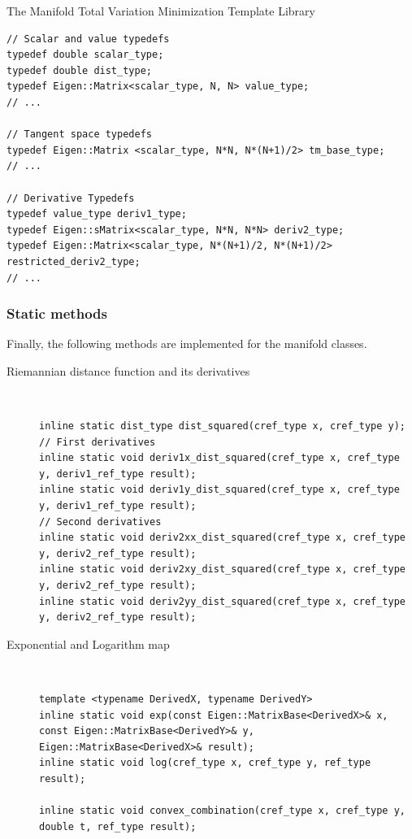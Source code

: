 \begin{chapter}{The Manifold Total Variation Minimization Template Library}
\cppinline
\begin{lstlisting}
// Scalar and value typedefs
typedef double scalar_type;
typedef double dist_type;
typedef Eigen::Matrix<scalar_type, N, N> value_type;
// ...

// Tangent space typedefs
typedef Eigen::Matrix <scalar_type, N*N, N*(N+1)/2> tm_base_type;
// ...

// Derivative Typedefs
typedef value_type deriv1_type;
typedef Eigen::sMatrix<scalar_type, N*N, N*N> deriv2_type;
typedef Eigen::Matrix<scalar_type, N*(N+1)/2, N*(N+1)/2> restricted_deriv2_type;
// ...
\end{lstlisting}

\subsubsection{Static methods} %
\label{ssub:Static methods}
Finally, the following methods are implemented for the manifold classes.

\begin{description}
    
    \item[Riemannian distance function and its derivatives] \hfill \\
	\cppinline
	\begin{lstlisting}
inline static dist_type dist_squared(cref_type x, cref_type y);
// First derivatives	    
inline static void deriv1x_dist_squared(cref_type x, cref_type y, deriv1_ref_type result);
inline static void deriv1y_dist_squared(cref_type x, cref_type y, deriv1_ref_type result);
// Second derivatives
inline static void deriv2xx_dist_squared(cref_type x, cref_type y, deriv2_ref_type result);
inline static void deriv2xy_dist_squared(cref_type x, cref_type y, deriv2_ref_type result);
inline static void deriv2yy_dist_squared(cref_type x, cref_type y, deriv2_ref_type result);
	\end{lstlisting}
    
    \item[Exponential and Logarithm map] \hfill \\
	\cppinline
	\begin{lstlisting}
template <typename DerivedX, typename DerivedY>
inline static void exp(const Eigen::MatrixBase<DerivedX>& x, const Eigen::MatrixBase<DerivedY>& y, Eigen::MatrixBase<DerivedX>& result);
inline static void log(cref_type x, cref_type y, ref_type result);

inline static void convex_combination(cref_type x, cref_type y, double t, ref_type result);
	\end{lstlisting}


\end{description}
\end{chapter}
